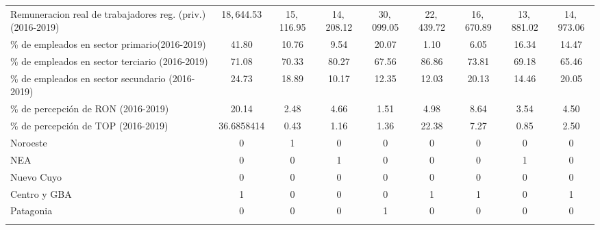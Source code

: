 \documentclass[12pt,a4paper]{article}
\begin{document}
\begin{table}
\begin{tabular}{@{\extracolsep{5pt}} lcccccccc}
Remuneracion  real de trabajadores reg. (priv.) (2016-2019) & 18$,$644.53 & 15$,$116.95 & 14$,$208.12 & 30$,$099.05 & 22$,$439.72 & 16$,$670.89 & 13$,$881.02 & 14$,$973.06 \\ 
\%  de empleados en sector primario(2016-2019) & 41.80 & 10.76 & 9.54 & 20.07 & 1.10 & 6.05 & 16.34 & 14.47 \\ 
\%  de empleados en sector terciario (2016-2019) & 71.08 & 70.33 & 80.27 & 67.56 & 86.86 & 73.81 & 69.18 & 65.46 \\ 
\%  de empleados en sector secundario (2016-2019) & 24.73 & 18.89 & 10.17 & 12.35 & 12.03 & 20.13 & 14.46 & 20.05 \\ 
\%  de percepción de RON (2016-2019) & 20.14 &  2.48 & 4.66 & 1.51 & 4.98 & 8.64 & 3.54 & 4.50 \\ 
\%  de percepción de TOP  (2016-2019) & 36.6858414 & 0.43 & 1.16 & 1.36 & 22.38 & 7.27 & 0.85 & 2.50 \\ 
Noroeste & 0 & 1 & 0 & 0 & 0 & 0 & 0 & 0 \\ 
NEA & 0 & 0 & 1 & 0 & 0 & 0 & 1 & 0 \\ 
Nuevo Cuyo & 0 & 0 & 0 & 0 & 0 & 0 & 0 & 0 \\ 
Centro y GBA & 1 & 0 & 0 & 0 & 1 & 1 & 0 & 1 \\ 
Patagonia & 0 & 0 & 0 & 1 & 0 & 0 & 0 & 0 \\ 
\hline \\[-1.8ex] 
\end{tabular} 

\end{table} 
\end{document}
